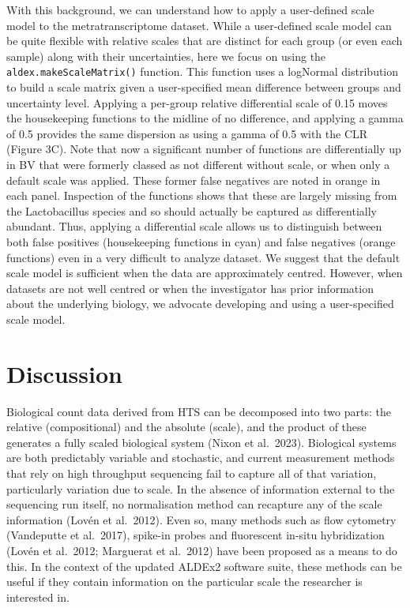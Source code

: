 \documentclass[
]{article}
\begin{document}
With this background, we can understand how to apply a user-defined
scale model to the metratranscriptome dataset. While a user-defined
scale model can be quite flexible with relative scales that are distinct
for each group (or even each sample) along with their uncertainties,
here we focus on using the \texttt{aldex.makeScaleMatrix()} function.
This function uses a logNormal distribution to build a scale matrix
given a user-specified mean difference between groups and uncertainty
level. Applying a per-group relative differential scale of 0.15 moves
the housekeeping functions to the midline of no difference, and applying
a gamma of 0.5 provides the same dispersion as using a gamma of 0.5 with
the CLR (Figure 3C). Note that now a significant number of functions are
differentially up in BV that were formerly classed as not different
without scale, or when only a default scale was applied. These former
false negatives are noted in orange in each panel. Inspection of the
functions shows that these are largely missing from the Lactobacillus
species and so should actually be captured as differentially abundant.
Thus, applying a differential scale allows us to distinguish between
both false positives (housekeeping functions in cyan) and false
negatives (orange functions) even in a very difficult to analyze
dataset. We suggest that the default scale model is sufficient when the
data are approximately centred. However, when datasets are not well
centred or when the investigator has prior information about the
underlying biology, we advocate developing and using a user-specified
scale model.

\hypertarget{discussion}{%
\section{Discussion}\label{discussion}}

Biological count data derived from HTS can be decomposed into two parts:
the relative (compositional) and the absolute (scale), and the product
of these generates a fully scaled biological system (Nixon et al.~2023).
Biological systems are both predictably variable and stochastic, and
current measurement methods that rely on high throughput sequencing fail
to capture all of that variation, particularly variation due to scale.
In the absence of information external to the sequencing run itself, no
normalisation method can recapture any of the scale information (Lovén
et al.~2012). Even so, many methods such as flow cytometry (Vandeputte
et al.~2017), spike-in probes and fluorescent in-situ hybridization
(Lovén et al.~2012; Marguerat et al.~2012) have been proposed as a means
to do this. In the context of the updated ALDEx2 software suite, these
methods can be useful if they contain information on the particular
scale the researcher is interested in.
\end{document}
